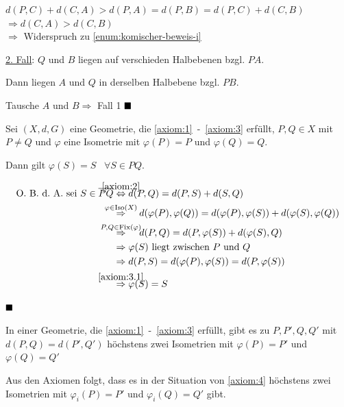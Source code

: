 \begin{beweis}
\begin{enumerate}[label=(\roman*)]
\begin{enumerate}[label=\alph*)]
                      $d(P,C) + d(C,A) > d(P,A) = d(P,B) = d(P,C) + d(C, B)$\\
                      $\Rightarrow d(C, A) > d(C, B)$\\
                      $\Rightarrow$ Widerspruch zu \cref{enum:komischer-beweis-i}
            \end{enumerate}
    \end{enumerate}

    \underline{2. Fall}: $Q$ und $B$ liegen auf verschieden Halbebenen bzgl. $PA$.

    Dann liegen $A$ und $Q$ in derselben Halbebene bzgl. $PB$.

    Tausche $A$ und $B \Rightarrow$  Fall 1 $\qed$
\end{beweis}

\begin{bemerkung}\label{kor:beh2'}
    Sei $(X, d, G)$ eine Geometrie, die \ref{axiom:1}~-~\ref{axiom:3}
    erfüllt, $P, Q \in X$ mit $P \neq Q$ und $\varphi$ eine Isometrie mit 
    $\varphi(P) = P$ und $\varphi(Q) = Q$.

    Dann gilt $\varphi(S) = S\;\;\;\forall S \in PQ$.
\end{bemerkung}

\begin{beweis}
    \begin{align*}
        \text{\Obda sei } S \in \overline{PQ} &\overset{\mathclap{\ref{axiom:2}}}{\Leftrightarrow} d(P,Q) = d(P,S) + d(S,Q)\\
        &\overset{\mathclap{\varphi \in \Iso(X)}}{\Rightarrow}\hspace{4 mm} d(\varphi(P),\varphi(Q)) = d(\varphi(P),\varphi(S)) + d(\varphi(S),\varphi(Q))\\
        &\overset{\mathclap{P, Q \in \Fix(\varphi)}}{\Rightarrow}\hspace{4 mm} d(P, Q) = d(P,\varphi(S)) + d(\varphi(S), Q)\\
        &\Rightarrow \varphi(S) \text{ liegt zwischen } P \text{ und } Q\\
        &\Rightarrow d(P,S) = d(\varphi(P), \varphi(S)) = d(P, \varphi(S))\\
        &\overset{\mathclap{\ref{axiom:3.1}}}{\Rightarrow} \varphi(S) = S
    \end{align*}

    $\qed$ 
\end{beweis}

\begin{proposition}\label{satz:14.4}%
    In einer Geometrie, die \ref{axiom:1}~-~\ref{axiom:3} erfüllt,
    gibt es zu $P, P', Q, Q'$ mit $d(P, Q) = d(P', Q')$ höchstens
    zwei Isometrien mit $\varphi(P) = P'$ und $\varphi(Q) = Q'$

    Aus den Axiomen  folgt, dass es in 
    der Situation von \ref{axiom:4} höchstens zwei Isometrien mit
    $\varphi_i(P) = P'$ und $\varphi_i(Q) = Q'$ gibt.
\end{proposition}

